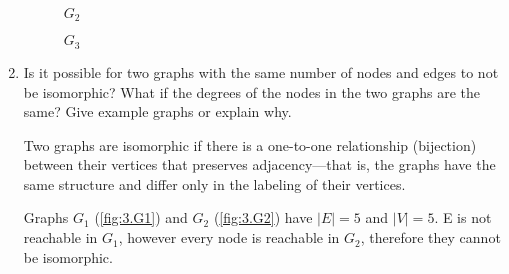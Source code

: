 \documentclass[11pt, letterpaper, includehead]{article}
\theoremstyle{plain}
\theoremstyle{mydefinition}
\theoremstyle{myproperty}
\begin{document}
\begin{enumerate}[label=\textbf{\arabic*}., leftmargin=*]
\begin{multicols}{3}
\begin{figure}[H]
                  \caption{$G_2$}
                  \label{fig:2.G2}
              \end{figure}

              \columnbreak

              \begin{figure}[H]
                  \centering
                  \caption{$G_3$}
                  \label{fig:2.G3}
              \end{figure}

          \end{multicols}
    \item Is it possible for two graphs with the same number of nodes and edges
          to not be isomorphic? What if the degrees of the nodes in the two
          graphs
          are the same? Give example graphs or explain why.

          Two graphs are isomorphic if there is a one-to-one relationship
          (bijection) between their vertices that preserves adjacency---that is, the
          graphs have the same structure and differ only in the labeling of their
          vertices.

          Graphs $G_1$ (\ref{fig:3.G1}) and $G_2$ (\ref{fig:3.G2}) have $|E| =
              5$ and $|V| = 5$. E is not reachable in $G_1$, however every node is reachable
          in $G_2$, therefore they cannot be isomorphic.


\end{enumerate}
\end{document}
